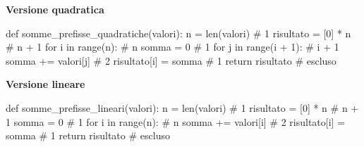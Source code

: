 \noindent\hspace*{2mm}%
\begin{minipage}[t]{\dimexpr\linewidth/2-4mm\relax}
\vspace{0pt}
\textbf{Versione quadratica}
\begin{unipdcode}[language=Python,
  basicstyle=\ttfamily\scriptsize,
  numbers=none,
  xleftmargin=0pt,
  xrightmargin=0pt,
  framexleftmargin=0.3em]
def somme_prefisse_quadratiche(valori):
    n = len(valori)               # 1
    risultato = [0] * n           # n + 1
    for i in range(n):            # n
        somma = 0                 # 1
        for j in range(i + 1):    # i + 1
            somma += valori[j]    # 2
        risultato[i] = somma      # 1
    return risultato              # escluso
\end{unipdcode}
\end{minipage}%
\hspace*{4mm}%
\begin{minipage}[t]{\dimexpr\linewidth/2-4mm\relax}
\vspace{0pt}
\textbf{Versione lineare}
\begin{unipdcode}[language=Python,
  basicstyle=\ttfamily\scriptsize,
  numbers=none,
  xleftmargin=0pt,
  xrightmargin=0pt,
  framexleftmargin=0.3em]
def somme_prefisse_lineari(valori):
    n = len(valori)               # 1
    risultato = [0] * n           # n + 1
    somma = 0                     # 1
    for i in range(n):            # n
        somma += valori[i]        # 2
        risultato[i] = somma      # 1
    return risultato              # escluso
\end{unipdcode}
\end{minipage}
